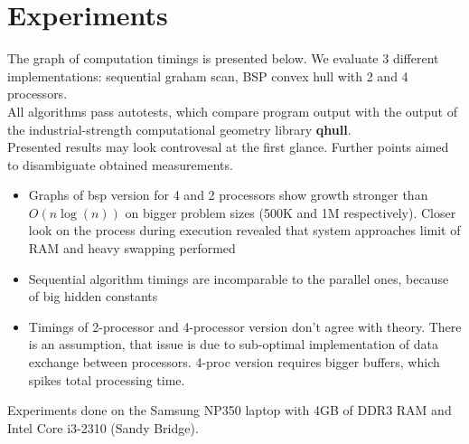 \documentclass[a4paper]{article}
\begin{document}
\section {Experiments}
    The graph of computation timings is presented below. 
    We evaluate 3 different implementations:
    sequential graham scan, BSP convex hull with 2 and 4 processors.\\
    All algorithms pass autotests, which compare program output with the
    output of the industrial-strength computational geometry library \textbf{qhull}.\\
    Presented results may look controvesal at the first glance.
    Further points aimed to disambiguate obtained measurements.\\
    \begin {figure}[htb!]
        \captionsetup[subfigure]{labelformat=empty}
        \centering
    \end {figure}
        \begin {itemize}
        \item  Graphs of bsp version for 4 and 2 processors show
            growth stronger than $O(n\log(n))$ on bigger problem sizes 
            (500K and 1M respectively). Closer look on the process 
            during execution revealed that system approaches limit
            of RAM and heavy swapping performed
        \item Sequential algorithm timings are incomparable to the
            parallel ones, because of big hidden constants
        \item Timings of 2-processor and 4-processor version don't
            agree with theory. There is an assumption, that 
            issue is due to sub-optimal implementation of 
            data exchange between processors. 4-proc version
            requires bigger buffers, which spikes total
            processing time.
    \end {itemize}
    Experiments done on the Samsung NP350 laptop with 4GB of DDR3 RAM and
    Intel Core i3-2310 (Sandy Bridge).
\end{document}
